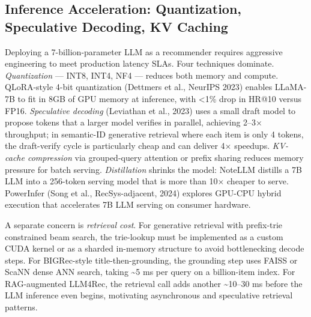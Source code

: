 \subsection{Inference Acceleration: Quantization, Speculative Decoding, KV Caching}\label{inference-acceleration-quantization-speculative-decoding-kv-caching}

Deploying a 7-billion-parameter LLM as a recommender requires aggressive engineering to meet production latency SLAs. Four techniques dominate. \emph{Quantization} --- INT8, INT4, NF4 --- reduces both memory and compute. QLoRA-style 4-bit quantization (Dettmers et al., NeurIPS 2023) enables LLaMA-7B to fit in 8GB of GPU memory at inference, with \textless1\% drop in HR@10 versus FP16. \emph{Speculative decoding} (Leviathan et al., 2023) uses a small draft model to propose tokens that a larger model verifies in parallel, achieving 2--3× throughput; in semantic-ID generative retrieval where each item is only 4 tokens, the draft-verify cycle is particularly cheap and can deliver 4× speedups. \emph{KV-cache compression} via grouped-query attention or prefix sharing reduces memory pressure for batch serving. \emph{Distillation} shrinks the model: NoteLLM distills a 7B LLM into a 256-token serving model that is more than 10× cheaper to serve. PowerInfer (Song et al., RecSys-adjacent, 2024) explores GPU-CPU hybrid execution that accelerates 7B LLM serving on consumer hardware.

A separate concern is \emph{retrieval cost}. For generative retrieval with prefix-trie constrained beam search, the trie-lookup must be implemented as a custom CUDA kernel or as a sharded in-memory structure to avoid bottlenecking decode steps. For BIGRec-style title-then-grounding, the grounding step uses FAISS or ScaNN dense ANN search, taking \textasciitilde5 ms per query on a billion-item index. For RAG-augmented LLM4Rec, the retrieval call adds another \textasciitilde10--30 ms before the LLM inference even begins, motivating asynchronous and speculative retrieval patterns.

